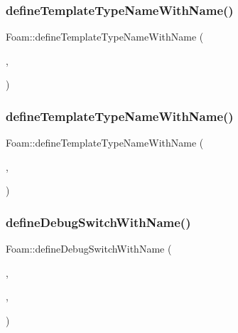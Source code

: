 \subsubsection{\texorpdfstring{define\+Template\+Type\+Name\+With\+Name()}{defineTemplateTypeNameWithName()}\hspace{0.1cm}{\footnotesize\ttfamily [12/13]}}
{\footnotesize\ttfamily Foam\+::define\+Template\+Type\+Name\+With\+Name (\begin{DoxyParamCaption}\item[{\hyperlink{classFoam_1_1registeredObject}{registered\+Object}$<$ Field$<$ spherical\+Tensor $>$$>$}]{,  }\item[{\char`\"{}reg\+Spherical\+Tensor\+Field\char`\"{}}]{ }\end{DoxyParamCaption})}

\mbox{\label{namespaceFoam_ade1772d0a4f79344abb501cfdd659cfa}} 
\subsubsection{\texorpdfstring{define\+Template\+Type\+Name\+With\+Name()}{defineTemplateTypeNameWithName()}\hspace{0.1cm}{\footnotesize\ttfamily [13/13]}}
{\footnotesize\ttfamily Foam\+::define\+Template\+Type\+Name\+With\+Name (\begin{DoxyParamCaption}\item[{\hyperlink{classFoam_1_1registeredObject}{registered\+Object}$<$ Field$<$ tensor $>$$>$}]{,  }\item[{\char`\"{}reg\+Tensor\+Field\char`\"{}}]{ }\end{DoxyParamCaption})}

\mbox{\label{namespaceFoam_afe0d23ba540a3bb37d950794c43e4070}} 
\subsubsection{\texorpdfstring{define\+Debug\+Switch\+With\+Name()}{defineDebugSwitchWithName()}}
{\footnotesize\ttfamily Foam\+::define\+Debug\+Switch\+With\+Name (\begin{DoxyParamCaption}\item[{external\+I\+O\+Object\+::external\+I\+O\+Object}]{,  }\item[{\char`\"{}external\+I\+O\+Object\char`\"{}}]{,  }\item[{0}]{ }\end{DoxyParamCaption})}

